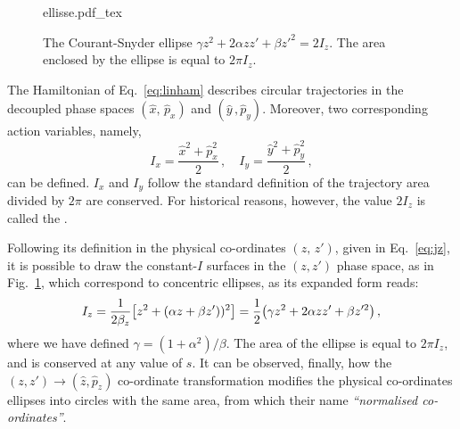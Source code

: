 \begin{figure}
    \centering
    \def\svgwidth{0.75\columnwidth}
    {ellisse.pdf_tex}
    \caption{The Courant-Snyder ellipse $\gamma z^2 + 2\alpha zz' + \beta z'^2=2I_z$. The area enclosed by the ellipse is equal to $2\pi I_z$. }
    \label{fig:coursnyd}
\end{figure}


The Hamiltonian of Eq.~\eqref{eq:linham} describes circular trajectories in the decoupled phase spaces $(\hat x,\,\hat p_x)$ and $(\hat y\,, \hat p_y)$. Moreover, two corresponding action variables, namely,
\begin{equation}
    I_x = \frac{\hat x^2 +\hat p_x^2}{2}\,, \quad I_y=\frac{\hat y^2+\hat p_y^2}{2} \,,
\end{equation}
can be defined. $I_x$ and $I_y$ follow the standard definition of the trajectory area divided by $2\pi$ are conserved. For historical reasons, however, the value $2I_z$ is called the .

Following its definition in the physical co-ordinates $(z,\, z')$, given in Eq.~\eqref{eq:jz}, it is possible to draw the constant-$I$ surfaces in the $(z,z')$ phase space, as in Fig.~\ref{fig:coursnyd}, which correspond to concentric ellipses, as its expanded form reads:
%
\begin{equation}
I_z = \frac{1}{2\beta_z}\qty[z^2 + (\alpha z + \beta z'))^2] = \frac{1}{2}\qty(\gamma z^2 + 2\alpha z z' + \beta z'^2)\,, \end{equation}
%
where we have defined $\gamma=(1+\alpha^2)/\beta$. The area of the ellipse is equal to $2\pi I_z$, and is conserved at any value of $s$. It can be observed, finally, how the $(z,z')\to(\hat z,\hat p_z)$ co-ordinate transformation modifies the physical co-ordinates ellipses into circles with the same area, from which their name \textit{``normalised co-ordinates''}.

